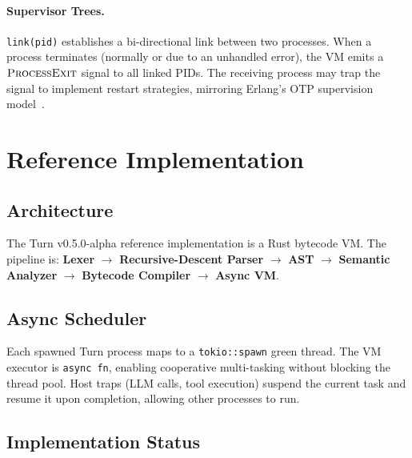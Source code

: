 \documentclass[sigplan,10pt,review,anonymous]{acmart}
\begin{document}
\paragraph{Supervisor Trees.}
\texttt{link(pid)} establishes a bi-directional link between two processes.
When a process terminates (normally or due to an unhandled error), the VM
emits a $\textsc{ProcessExit}$ signal to all linked PIDs. The receiving process
may trap the signal to implement restart strategies, mirroring Erlang's OTP
supervision model~\cite{erlang}.

\section{Reference Implementation}

\subsection{Architecture}

The Turn v0.5.0-alpha reference implementation is a Rust bytecode VM. The
pipeline is: \textbf{Lexer} $\to$ \textbf{Recursive-Descent Parser} $\to$
\textbf{AST} $\to$ \textbf{Semantic Analyzer} $\to$ \textbf{Bytecode Compiler}
$\to$ \textbf{Async VM}.

\subsection{Async Scheduler}

Each spawned Turn process maps to a \texttt{tokio::spawn} green thread. The
VM executor is \texttt{async fn}, enabling cooperative multi-tasking without
blocking the thread pool. Host traps (LLM calls, tool execution) suspend the
current task and resume it upon completion, allowing other processes to run.

\subsection{Implementation Status}
\end{document}
